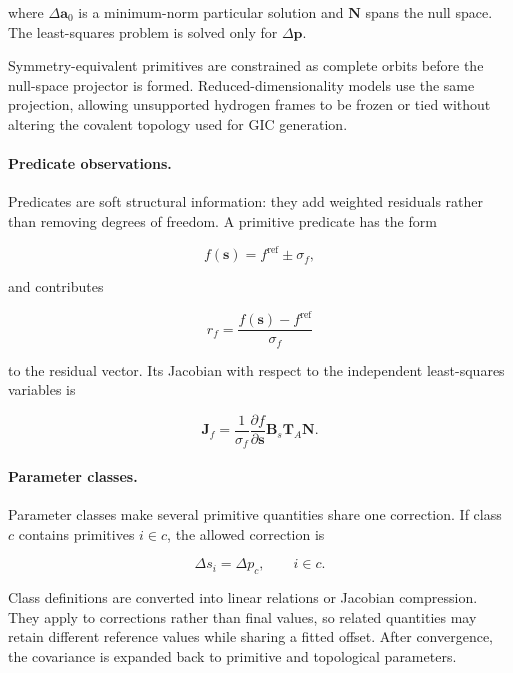 \documentclass[aip,jcp,reprint,longbibliography,floatfix]{revtex4-2}
\begin{document}
where $\Delta\mathbf{a}_0$ is a minimum-norm particular solution and
$\mathbf{N}$ spans the null space. The least-squares problem is solved only
for $\Delta\mathbf{p}$.

Symmetry-equivalent primitives are constrained as complete orbits before the
null-space projector is formed. Reduced-dimensionality models use the same projection,
allowing unsupported hydrogen frames to be frozen or tied without altering the covalent topology
used for GIC generation.

\paragraph{Predicate observations.}

Predicates are soft structural information: they add weighted residuals rather
than removing degrees of freedom.\cite{Bartell1975Predicate} A primitive
predicate has the form

\begin{equation}
f(\mathbf{s})
=
f^{\mathrm{ref}}
\pm
\sigma_f ,
\end{equation}

and contributes

\begin{equation}
r_f
=
\frac{f(\mathbf{s})-f^{\mathrm{ref}}}{\sigma_f}
\end{equation}

to the residual vector. Its Jacobian with respect to the independent
least-squares variables is

\begin{equation}
\mathbf{J}_f
=
\frac{1}{\sigma_f}
\frac{\partial f}{\partial\mathbf{s}}
\mathbf{B}_s
\mathbf{T}_{A}
\mathbf{N}.
\end{equation}

\paragraph{Parameter classes.}

Parameter classes make several primitive quantities share one correction. If
class $c$ contains primitives $i\in c$, the allowed correction is

\begin{equation}
\Delta s_i
=
\Delta p_c,
\qquad
i\in c .
\end{equation}

Class definitions are converted into linear relations or Jacobian compression.
They apply to corrections rather than final values, so related quantities may
retain different reference values while sharing a fitted offset. After
convergence, the covariance is expanded back to primitive and topological
parameters.
\end{document}
